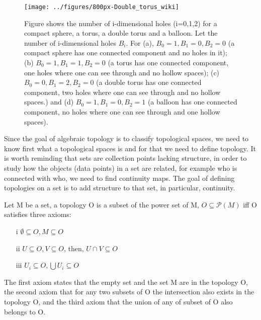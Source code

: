 \documentclass[onecollarge,runningheads]{svjour2}
\begin{document}
 \begin{figure}[h]
        \centering
        \texttt{[image: ../figures/800px-Double\_torus\_wiki]}
        \caption{Figure shows the number of i-dimensional holes (i=0,1,2) for a compact sphere, a torus, a double torus and a balloon.
        Let the number of i-dimensional holes $B_i$. For (a), $B_0=1, B_1=0, B_2=0$ (a compact sphere has one connected component and no holes in it); (b) $B_0=1, B_1=1, B_2=0$ (a torus has one connected component, one holes where one can see through and no hollow spaces); (c) $B_0=0, B_1=2, B_2=0$ (a double torus has one connected component, two holes where one can see through and no hollow spaces.) and (d) $B_0=1, B_1=0, B_2=1$ (a balloon has one connected component, no holes where one can see through and one hollow spaces).
        }
\label{fig:iholes}
\end{figure}

Since the goal of algebraic topology is to classify topological spaces, we need to know first what a topological spaces is and for that we need to define topology.
It is worth reminding that sets are collection points lacking structure, in order to study how the objects (data points) in a set are related, for example who is connected with who, we need to find continuity maps. The goal of defining topologies on a set is to add structure to that set, in particular, continuity.

\begin{definition}
Let M be a set, a topology O is a subset of the power set of M, $O \subseteq \mathcal{P}(M)$ iff O  satisfies three axioms:
\begin{itemize}
\item[i] $\emptyset \subseteq O, M \subseteq O$
\item[ii] $U \subseteq  O, V \subseteq O$, then, $U \cap V \subseteq O$
\item[iii] $U_i \subseteq O, \bigcup  U_i \subseteq O$
\end{itemize}
\label{def:topology}
\end{definition}

The first axiom states that the empty set and the set M are in the topology O, the second axiom that for any two subsets of O the intersection also exists in the topology O, and the third axiom that the union of any of subset of O also belongs to O. 
\end{document}
